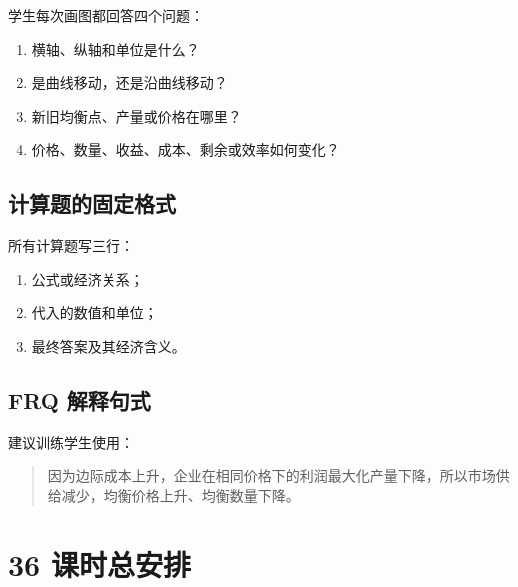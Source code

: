 \documentclass[11pt,a4paper]{ctexart}
\begin{document}
学生每次画图都回答四个问题：

\begin{enumerate}[leftmargin=2em]
  \item 横轴、纵轴和单位是什么？
  \item 是曲线移动，还是沿曲线移动？
  \item 新旧均衡点、产量或价格在哪里？
  \item 价格、数量、收益、成本、剩余或效率如何变化？
\end{enumerate}

\subsection{计算题的固定格式}

所有计算题写三行：

\begin{enumerate}[leftmargin=2em]
  \item 公式或经济关系；
  \item 代入的数值和单位；
  \item 最终答案及其经济含义。
\end{enumerate}

\subsection{FRQ 解释句式}

建议训练学生使用：

\begin{quote}
因为边际成本上升，企业在相同价格下的利润最大化产量下降，所以市场供给减少，均衡价格上升、均衡数量下降。
\end{quote}

\section{36 课时总安排}
\end{document}
